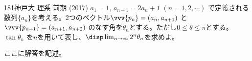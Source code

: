 \begin{thm}{181}{}{神戸大 理系 前期 (2017)}
 $a_1=1$, $a_{n+1}=2a_n+1$ $(n=1, 2, \cdots)$ で定義される数列$\{a_n\}$を考える。2つのベクトル$\vvv{p_n}=(a_n, a_{n+1})$ と$\vvv{p_{n+1}}=(a_{n+1},a_{n+2})$ のなす角を$\theta_n$とする。ただし$0\le\theta\le\pi$とする。$\tan\theta_n$ を$n$を用いて表し、$\disp \lim_{n\to\infty}2^n\theta_n$を求めよ。
\end{thm}

ここに解答を記述。